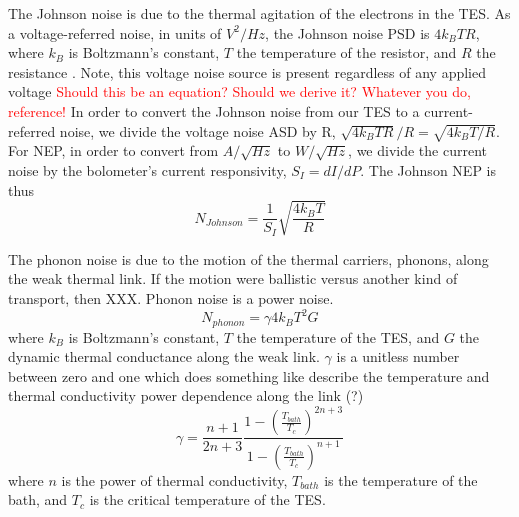 The Johnson noise is due to the thermal agitation of the electrons in the \ac{TES}. 
As a voltage-referred noise, in units of $V^2/Hz$, the Johnson noise \ac{PSD} is $4k_{B}TR$,
where $k_{B}$ is Boltzmann's constant, $T$ the temperature of the resistor, and $R$ the resistance \cite{}.
Note, this voltage noise source is present regardless of any applied voltage
\textcolor{red}{Should this be an equation? Should we derive it? Whatever you do, reference!}
In order to convert the Johnson noise from our \ac{TES} to a current-referred noise, we divide the voltage noise \ac{ASD} by R, $\sqrt{4k_{B}TR}/R = \sqrt{4k_BT/R}$. 
For \ac{NEP}, in order to convert from $A/\sqrt{Hz}$ to $W/\sqrt{Hz}$, we divide the current noise by the bolometer's current responsivity, $S_{I} = dI/dP$. 
The Johnson \ac{NEP} is thus
\begin{equation}
N_{Johnson} =  \frac{1}{S_I} \sqrt{ \frac{4k_{B}T}{R}}
\label{eq:johnson}
\end{equation}

The phonon noise is due to the motion of the thermal carriers, phonons, along the weak thermal link. 
If the motion were ballistic versus another kind of transport, then XXX. 
Phonon noise is a power noise. 
\begin{equation}
N_{phonon} = \gamma 4k_{B} T^2 G
\label{eq:phonon}
\end{equation}
where $k_{B}$ is Boltzmann's constant, $T$ the temperature of the \ac{TES}, and $G$ the dynamic thermal conductance along the weak link. 
 $\gamma$ is a unitless number between zero and one which does something like describe the temperature and thermal conductivity power dependence along the link (?)
 \begin{equation}
\gamma = \frac{n+1}{2n+3} \frac{1-\left(\frac{T_{bath}}{T_c}\right)^{2n+3}}{1-\left(\frac{T_{bath}}{T_c}\right)^{n+1}}
\label{eq:gamma}
\end{equation}
where $n$ is the power of thermal conductivity, $T_{bath}$ is the temperature of the bath, and $T_c$ is the critical temperature of the \ac{TES}.

